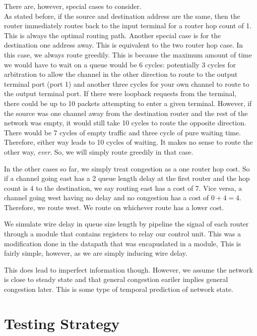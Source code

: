 \documentclass[10pt]{article}
\begin{document}
There are, however, special cases to consider. \\
As stated before, if the source and destination address are the same, then the
router immediately routes back to the input terminal for a router hop count 
of 1.
This is always the optimal routing path.
Another special case is for the destination one address away. 
This is equivalent to the two router hop case.
In this case, we always route greedily. 
This is because the maximum amount of time we would have to wait on a queue
would be 6 cycles: 
potentially 3 cycles for arbitration to allow the channel in the other 
direction to route to the output terminal port (port 1) and another three
cycles for your own channel to route to the output terminal port.
If there were loopback requests from the terminal, there could be up to 10 
packets attempting to enter a given terminal.
However, if the source was one channel away from the destination router and the
rest of the network was empty, it would still take 10 cycles to route the 
opposite direction. 
There would be 7 cycles of empty traffic and three cycle of pure waiting time.
Therefore, either way leads to 10 cycles of waiting.
It makes no sense to route the other way, \textit{ever}.
So, we will simply route greedily in that case. \par

In the other cases so far, we simply treat congestion as a one router hop 
cost.
So if a channel going east has a 2 queue length delay at the first router 
and the hop count is 4 to the destination, we say routing east has a cost of 7.
Vice versa, a channel going west having no delay and no congestion has a cost
of $ 0 + 4 =4 $. 
Therefore, we route west. 
We route on whichever route has a lower cost. \par

We simulate wire delay in queue size length by pipeline the signal of each 
router through a module that contains registers to relay our control unit. 
This was a modification done in the datapath that was encapuslated in a 
module, 
This is fairly simple, however, as we are simply inducing wire delay. \par
This does lead to imperfect information though.
However, we assume the network is close to steady state and that general 
congestion eariler implies general congestion later.
This is some type of temporal prediction of network state.

\section{Testing Strategy}
\end{document}
